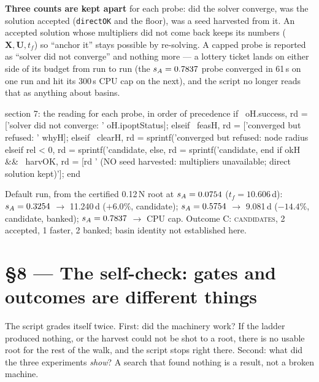 \documentclass[11pt]{article}
\newcommand{\tf}{t_f}\newcommand{\R}{\mathbb{R}}
\newcommand{\file}[1]{\texttt{#1}}
\begin{document}
\begin{rig}
\textbf{Three counts are kept apart} for each probe: did the solver
converge, was the solution accepted (\file{directOK} and the floor), was a
seed harvested from it. An accepted solution whose multipliers did not come
back keeps its numbers ($\bm X,\bm U,\tf$) so ``anchor it'' stays possible
by re-solving. A capped probe is reported as ``solver did not converge''
and nothing more --- a lottery ticket lands on either side of its budget
from run to run (the $s_A=0.7837$ probe converged in 61\,s on one run and
hit its 300\,s CPU cap on the next), and the script no longer reads that as
anything about basins.
\end{rig}

\begin{snippet}{section 7: the reading for each probe, in order of precedence}
if ~oH.success,   rd = ['solver did not converge: ' oH.ipoptStatus];
elseif ~feasH,    rd = ['converged but refused: ' whyH];
elseif ~clearH,   rd = sprintf('converged but refused: node radius %
elseif rel < 0,   rd = sprintf('candidate, %
else,             rd = sprintf('candidate, %
end
if okH && ~harvOK, rd = [rd ' (NO seed harvested: multipliers unavailable; direct solution kept)']; end
\end{snippet}

\begin{meas}
Default run, from the certified 0.12\,N root at $s_A=0.0754$
($\tf=10.606$\,d): $s_A=0.3254$ $\to$ 11.240\,d ($+6.0\%$, candidate);
$s_A=0.5754$ $\to$ 9.081\,d ($-14.4\%$, candidate, banked);
$s_A=0.7837$ $\to$ CPU cap. Outcome C: \textsc{candidates}, 2 accepted,
1 faster, 2 banked; basin identity not established here.
\end{meas}

\section{\S8 --- The self-check: gates and outcomes are different things}

\begin{eli}
The script grades itself twice. First: did the machinery work? If the
ladder produced nothing, or the harvest could not be shot to a root, there
is no usable root for the rest of the walk, and the script stops right
there. Second: what did the three experiments \emph{show}? A search that
found nothing is a result, not a broken machine.
\end{eli}
\end{document}
